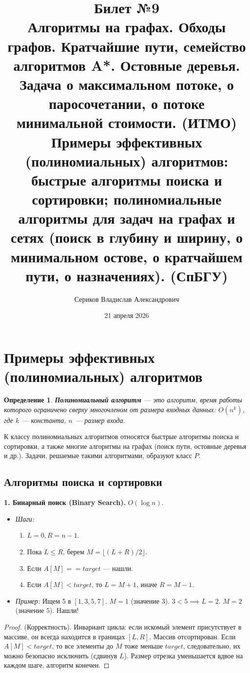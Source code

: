 \documentclass[12pt, a4paper]{article}
\title{Билет №9 \\ \small Алгоритмы на графах. Обходы графов. Кратчайшие пути, семейство алгоритмов A*. Остовные деревья. Задача о максимальном потоке, о паросочетании, о потоке минимальной стоимости. (ИТМО) \\ Примеры эффективных (полиномиальных) алгоритмов: быстрые алгоритмы поиска и сортировки; полиномиальные алгоритмы для задач на графах и сетях (поиск в глубину и ширину, о минимальном остове, о кратчайшем пути, о назначениях). (СпБГУ)}
\author{Сериков Владислав Александрович}
\date{21 апреля 2026}
\newtheorem{definition}{Определение}
\begin{document}
\maketitle
\tableofcontents
\newpage

\section{Примеры эффективных (полиномиальных) алгоритмов}

\begin{definition}
\textbf{Полиномиальный алгоритм} --- это алгоритм, время работы которого ограничено сверху многочленом от размера входных данных: $O(n^k)$, где $k$ --- константа, $n$ --- размер входа.
\end{definition}

К классу полиномиальных алгоритмов относятся быстрые алгоритмы поиска и сортировки, а также многие алгоритмы на графах (поиск пути, остовные деревья и др.). Задачи, решаемые такими алгоритмами, образуют класс $P$.

\subsection{Алгоритмы поиска и сортировки}

\textbf{1. Бинарный поиск (Binary Search).} $O(\log n)$.
\begin{itemize}
    \item \textit{Шаги:}
    \begin{enumerate}
        \item $L=0, R=n-1$.
        \item Пока $L \le R$, берем $M = \lfloor(L+R)/2\rfloor$.
        \item Если $A[M] == target$ --- нашли.
        \item Если $A[M] < target$, то $L = M+1$, иначе $R = M-1$.
    \end{enumerate}
    \item \textit{Пример:} Ищем 5 в $[1, 3, 5, 7]$. $M=1$ (значение 3). $3 < 5 \implies L=2$. $M=2$ (значение 5). Нашли!
\end{itemize}
\begin{proof}
(Корректность). Инвариант цикла: если искомый элемент присутствует в массиве, он всегда находится в границах $[L, R]$. Массив отсортирован. Если $A[M] < target$, то все элементы до $M$ тоже меньше $target$, следовательно, их можно безопасно исключить (сдвинув $L$). Размер отрезка уменьшается вдвое на каждом шаге, алгоритм конечен.
\end{proof}
\end{document}
